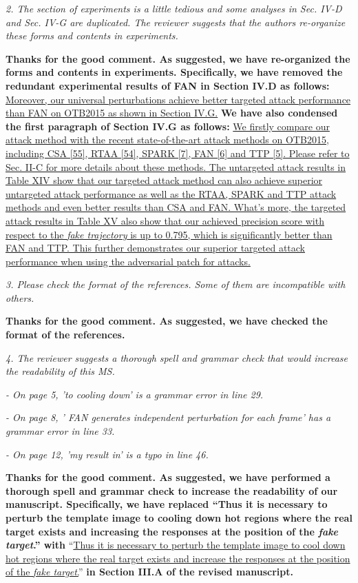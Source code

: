 \documentclass[12pt]{article}
\begin{document}
\textit{2. The section of experiments is a little tedious and some analyses in Sec. IV-D and Sec. IV-G are duplicated. The reviewer suggests that the authors re-organize these forms and contents in experiments.}

\textbf{Thanks for the good comment. As suggested, we have re-organized the forms and contents in experiments. Specifically, we have removed the redundant experimental results of FAN in Section IV.D as follows:} \uline{Moreover, our universal perturbations achieve better targeted attack performance than FAN on OTB2015 as shown in Section IV.G.} \textbf{We have also condensed the first paragraph of Section IV.G as follows:} \uline{We firstly compare our attack method with the recent state-of-the-art attack methods on OTB2015, including CSA [55], RTAA [54], SPARK [7], FAN [6] and TTP [5]. Please refer to Sec. II-C for more details about these methods. The untargeted attack results in Table XIV show that our targeted attack method can also achieve superior untargeted attack performance as well as the RTAA, SPARK and TTP attack methods and even better results than CSA and FAN. What’s more, the targeted attack results in Table XV also show that our achieved precision score with respect to the \textit{fake trajectory} is up to 0.795, which is significantly better than FAN and TTP. This further demonstrates our superior targeted attack performance when using the adversarial patch for attacks.}

\textit{3. Please check the format of the references. Some of them are incompatible with others.}

\textbf{Thanks for the good comment. As suggested, we have checked the format of the references.}

\textit{4. The reviewer suggests a thorough spell and grammar check that would increase the readability of this MS.}

\textit{- On page 5, 'to cooling down' is a grammar error in line 29.}

\textit{- On page 8, ' FAN generates independent perturbation for each frame' has a grammar error in line 33.}

\textit{- On page 12, 'my result in' is a typo in line 46.}

\textbf{Thanks for the good comment. As suggested, we have performed a thorough spell and grammar check to increase the readability of our manuscript. Specifically, we have replaced ``Thus it is necessary to perturb the template image to cooling down hot regions where the real target exists and increasing the responses at the position of the \textit{fake target}.'' with} ``\uline{Thus it is necessary to perturb the template image to cool down hot regions where the real target exists and increase the responses at the position of the \textit{fake target}.}''
\textbf{in Section III.A of the revised manuscript.}
\end{document}
